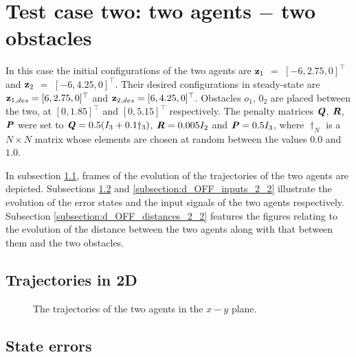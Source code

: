 \section{Test case two: two agents $-$ two obstacles}

In this case the initial configurations of the two agents are
$\bm{\mathbf{z}}_1$ $=$ $[-6, 2.75, 0]^{\top}$ and
$\bm{\mathbf{z}}_2$ $=$ $[-6, 4.25, 0]^{\top}$.
Their desired configurations in steady-state are
$\bm{\mathbf{z}}_{1,des} = [6, 2.75, 0]^{\top}$ and
$\bm{\mathbf{z}}_{2,des} = [6, 4.25, 0]^{\top}$.
Obstacles $o_1$, $0_2$ are placed between the two, at $[0, 1.85]^{\top}$
and $[0, 5.15]^{\top}$ respectively. The penalty
matrices $\bm{\mathit{Q}}$, $\bm{\mathit{R}}$, $\bm{\mathit{P}}$ were set to
$\bm{\mathit{Q}} = 0.5 (I_3 + 0.1 \dagger_3)$, $\bm{\mathit{R}} = 0.005 I_2$ and
$\bm{\mathit{P}} = 0.5 I_3$, where $\dagger_N$ is a $N \times N$ matrix whose
elements are chosen at random between the values $0.0$ and $1.0$.

In subsection \ref{subsection:d_OFF_trajectories_2_2}, frames of the evolution of the
trajectories of the two agents are depicted. Subsections
\ref{subsection:d_OFF_errors_2_2} and \ref{subsection:d_OFF_inputs_2_2} illustrate
the evolution of the error states and the input signals of the two agents
respectively. Subsection \ref{subsection:d_OFF_distances_2_2} features the
figures relating to the evolution of the distance between the two agents
along with that between them and the two obstacles.


\subsection{Trajectories in 2D}
\label{subsection:d_OFF_trajectories_2_2}

\begin{figure}[H]
  
  \caption{The trajectories of the two agents in the $x-y$ plane.}
  \label{fig:d_OFF_trajectory_2_2}
\end{figure}


\subsection{State errors}
\label{subsection:d_OFF_errors_2_2}

